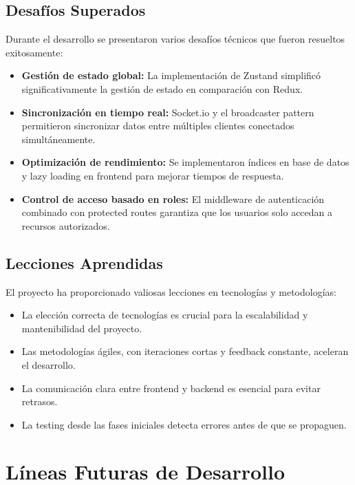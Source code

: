 \documentclass[a4paper]{report}
\begin{document}
\subsection*{Desafíos Superados}

Durante el desarrollo se presentaron varios desafíos técnicos que fueron resueltos exitosamente:

\begin{itemize}
  \item \textbf{Gestión de estado global:} La implementación de Zustand simplificó significativamente la gestión de estado en comparación con Redux.
  
  \item \textbf{Sincronización en tiempo real:} Socket.io y el broadcaster pattern permitieron sincronizar datos entre múltiples clientes conectados simultáneamente.
  
  \item \textbf{Optimización de rendimiento:} Se implementaron índices en base de datos y lazy loading en frontend para mejorar tiempos de respuesta.
  
  \item \textbf{Control de acceso basado en roles:} El middleware de autenticación combinado con protected routes garantiza que los usuarios solo accedan a recursos autorizados.
\end{itemize}

\subsection*{Lecciones Aprendidas}

El proyecto ha proporcionado valiosas lecciones en tecnologías y metodologías:

\begin{itemize}
  \item La elección correcta de tecnologías es crucial para la escalabilidad y mantenibilidad del proyecto.
  \item Las metodologías ágiles, con iteraciones cortas y feedback constante, aceleran el desarrollo.
  \item La comunicación clara entre frontend y backend es esencial para evitar retrasos.
  \item La testing desde las fases iniciales detecta errores antes de que se propaguen.
\end{itemize}

\newpage

\section*{Líneas Futuras de Desarrollo}
\end{document}
